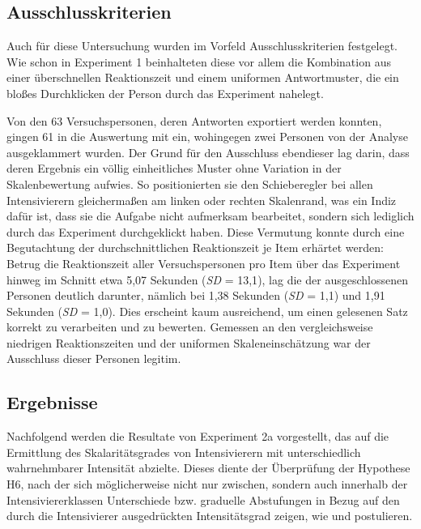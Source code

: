 \subsection{Ausschlusskriterien}
Auch für diese Untersuchung wurden im Vorfeld Ausschlusskriterien festgelegt. Wie schon in Experiment 1 beinhalteten diese vor allem die Kombination aus einer überschnellen Reaktionszeit und einem uniformen Antwortmuster, die ein bloßes Durchklicken der Person durch das Experiment nahelegt.


Von den 63 Versuchspersonen, deren Antworten exportiert werden konnten, gingen 61 in die Auswertung mit ein, wohingegen zwei Personen von der Analyse ausgeklammert wurden. Der Grund für den Ausschluss ebendieser lag darin, dass deren Ergebnis ein völlig einheitliches Muster ohne Variation in der Skalenbewertung aufwies. So positionierten sie den Schieberegler bei allen Intensivierern gleichermaßen am linken oder rechten Skalenrand, was ein Indiz dafür ist, dass sie die Aufgabe nicht aufmerksam bearbeitet, sondern sich lediglich durch das Experiment durchgeklickt haben. Diese Vermutung konnte durch eine Begutachtung der durchschnittlichen Reaktionszeit je Item erhärtet werden: Betrug die Reaktionszeit aller Versuchspersonen pro Item über das Experiment hinweg im Schnitt etwa 5,07 Sekunden ({\textit{SD} = 13,1}), lag die der ausgeschlossenen Personen deutlich darunter, nämlich bei 1,38 Sekunden ({\textit{SD} = 1,1}) und 1,91 Sekunden (\textit{SD} = 1,0). Dies erscheint kaum ausreichend, um einen gelesenen Satz korrekt zu verarbeiten und zu bewerten. Gemessen an den vergleichsweise niedrigen Reaktionszeiten und der uniformen Skaleneinschätzung war der Ausschluss dieser Personen legitim.




\subsection{Ergebnisse}\label{abs:Ergebnisse147}
Nachfolgend werden die Resultate von Experiment 2a vorgestellt, das auf die Ermittlung des Skalaritätsgrades von Intensivierern mit unterschiedlich wahrnehmbarer Intensität abzielte. Dieses diente der Überprüfung der Hypothese H6, nach der sich möglicherweise nicht nur zwischen, sondern auch innerhalb der Intensiviererklassen Unterschiede bzw. graduelle Abstufungen in Bezug auf den durch die Intensivierer ausgedrückten Intensitätsgrad zeigen, wie \citet[87]{Biedermann.1969} und \citet[408]{Breindl.2007} postulieren.


